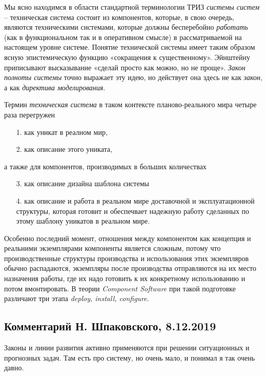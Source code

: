 \documentclass[11pt,a4paper]{article}
\begin{document}
Мы ясно находимся в области стандартной терминологии ТРИЗ \emph{системы
  систем} -- техническая система состоит из компонентов, которые, в свою
очередь, являются техническими системами, которые должны бесперебойно
\emph{работать} (как в функциональном так и в оперативном смысле) в
рассматриваемой на настоящем уровне системе. Понятие технической системы имеет
таким образом ясную эпистемическую функцию «сокращения к существенному».
Эйнштейну приписывают высказывание «сделай просто как можно, но не проще».
\emph{Закон полноты системы} точно выражает эту идею, но действует она здесь
не как \emph{закон}, а как \emph{директива моделирования}.

Термин \emph{техническая система} в таком контексте планово-реального мира
четыре раза перегружен
\begin{itemize}
\item [1.] как уникат в реалном мир,
\item [2.] как описание этого униката,
\end{itemize}
а также для компонентов, производимых в больших количествах
\begin{itemize}
\item [3.] как описание дизайна шаблона системы
\item [4.] как описание и работа в реальном мире доставочной и
  эксплуатационной структуры, которая готовит и обеспечвает надежную работу
  сделанных по этому шаблону уникатов в реальном мире.
\end{itemize}

Особенно последний момент, отношения между компонентом как концепция и
реальними экземплярами компоненты является сложным, потому что
производственные структуры производства и использования этих экземпляров
обычно распадаются, экземпляры после производства отправляются на их место
назначения работы, где их надо готовить к их конкретному использованию и потом
вмонтировать. В теории \emph{Component Software} при такой подготовке различают
три этапа \emph{deploy, install, configure}.

\subsection{Комментарий Н. Шпаковского, 8.12.2019}

Законы и линии развития активно применяются при решении ситуационных и
прогнозных задач. Там есть про систему, но очень мало, и понимал я так очень
давно.
 
\end{document}
